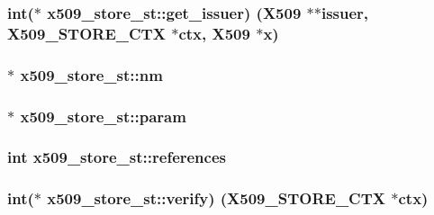 \subsubsection[{\texorpdfstring{get\+\_\+issuer}{get_issuer}}]{\setlength{\rightskip}{0pt plus 5cm}int($\ast$ x509\+\_\+store\+\_\+st\+::get\+\_\+issuer) ({\bf X509} $\ast$$\ast$issuer, {\bf X509\+\_\+\+S\+T\+O\+R\+E\+\_\+\+C\+TX} $\ast$ctx, {\bf X509} $\ast$x)}\hypertarget{structx509__store__st_a1201b752d9780b08579097b6f53f05b6}{}\label{structx509__store__st_a1201b752d9780b08579097b6f53f05b6}
\subsubsection[{\texorpdfstring{nm}{nm}}]{ $\ast$ x509\+\_\+store\+\_\+st\+::nm}\hypertarget{structx509__store__st_a15c220dcc8bf593c683cec71425a5519}{}\label{structx509__store__st_a15c220dcc8bf593c683cec71425a5519}
\subsubsection[{\texorpdfstring{param}{param}}]{$\ast$ x509\+\_\+store\+\_\+st\+::param}\hypertarget{structx509__store__st_a988c764019923790356d956bc071c50b}{}\label{structx509__store__st_a988c764019923790356d956bc071c50b}
\subsubsection[{\texorpdfstring{references}{references}}]{\setlength{\rightskip}{0pt plus 5cm}int x509\+\_\+store\+\_\+st\+::references}\hypertarget{structx509__store__st_a2ecec6a415050f38b3d260c258f4f913}{}\label{structx509__store__st_a2ecec6a415050f38b3d260c258f4f913}
\subsubsection[{\texorpdfstring{verify}{verify}}]{\setlength{\rightskip}{0pt plus 5cm}int($\ast$ x509\+\_\+store\+\_\+st\+::verify) ({\bf X509\+\_\+\+S\+T\+O\+R\+E\+\_\+\+C\+TX} $\ast$ctx)}\hypertarget{structx509__store__st_a942efe26133aadd04d45f30a824644a7}{}\label{structx509__store__st_a942efe26133aadd04d45f30a824644a7}
